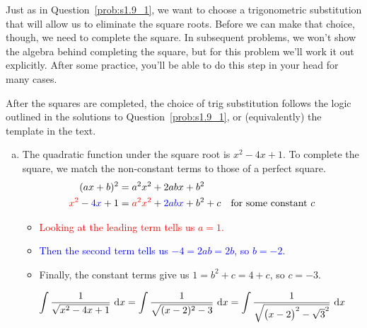 \begin{solution}
Just as in Question~\ref{prob:s1.9_1}, we want to choose a trigonometric substitution that will allow us to eliminate the square roots. Before we can make that choice, though, we need to complete the square. In subsequent problems, we won't show the algebra behind completing the square, but for this problem we'll work it out explicitly. After some practice, you'll  be able to do this step in your head for many cases.

After the squares are completed, the choice of trig substitution follows the logic outlined in the solutions to Question~\ref{prob:s1.9_1}, or (equivalently) the template in the text.

\begin{enumerate}[(a)]
\item
The quadratic function under the square root is $x^2-4x+1$. To complete the square, we match the non-constant terms to those of a perfect square.
\begin{align*}
(ax+b)^2&=a^2x^2+2abx+b^2\\
\textcolor{red}{x^2}-\textcolor{blue}{4x}+1&=\textcolor{red}{a^2x^2} + \textcolor{blue}{2abx} +b^2 + c \quad\mbox{for some constant $c$}
\end{align*}
\begin{itemize}
\item \textcolor{red}{Looking at the leading term tells us $a=1$. }
\item \textcolor{blue}{Then the second term tells us $-4=2ab=2b$, so $b=-2$.}
\item Finally, the constant terms give us $1=b^2+c=4+c$, so $c=-3$.
\end{itemize}

 \[\displaystyle\int \dfrac{1}{\sqrt{x^2-4x+1}}~\dee{x}=\displaystyle\int \dfrac{1}{\sqrt{(x-2)^2-3}}~\dee{x}=\displaystyle\int \dfrac{1}{\sqrt{\left(x-2\vphantom{\sqrt{3}}\right)^2-\sqrt{3}^2}}~\dee{x}\]


\end{enumerate}
\end{solution}
